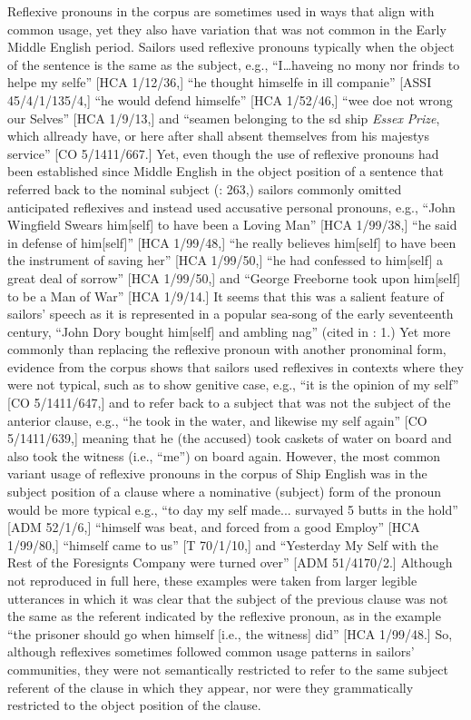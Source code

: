   Reflexive pronouns in the corpus are sometimes used in ways that align with common usage, yet they also have variation that was not common in the Early Middle English period. Sailors used reflexive pronouns typically when the object of the sentence is the same as the subject, e.g., “I…haveing no mony nor frinds to helpe my selfe” [HCA 1/12/36,] “he thought himselfe in ill companie” [ASSI 45/4/1/135/4,] “he would defend himselfe” [HCA 1/52/46,] “wee doe not wrong our Selves” [HCA 1/9/13,] and “seamen belonging to the sd ship \textit{Essex} \textit{Prize}, which allready have, or here after shall absent themselves from his majestys service” [CO 5/1411/667.] Yet, even though the use of reflexive pronouns had been established since Middle English in the object position of a sentence that referred back to the nominal subject (\citealt{MillwardHayes2012}: 263,) sailors commonly omitted anticipated reflexives and instead used accusative personal pronouns, e.g., “John Wingfield Swears him[self] to have been a Loving Man” [HCA 1/99/38,] “he said in defense of him[self]” [HCA 1/99/48,] “he really believes him[self] to have been the instrument of saving her” [HCA 1/99/50,] “he had confessed to him[self] a great deal of sorrow” [HCA 1/99/50,] and “George Freeborne took upon him[self] to be a Man of War” [HCA 1/9/14.] It seems that this was a salient feature of sailors’ speech as it is represented in a popular sea-song of the early seventeenth century, “John Dory bought him[self] and ambling nag” (cited in \citealt{Palmer1986}: 1.) Yet more commonly than replacing the reflexive pronoun with another pronominal form, evidence from the corpus shows that sailors used reflexives in contexts where they were not typical, such as to show genitive case, e.g., “it is the opinion of my self” [CO 5/1411/647,] and to refer back to a subject that was not the subject of the anterior clause, e.g., “he took in the water, and likewise my self again” [CO 5/1411/639,] meaning that he (the accused) took caskets of water on board and also took the witness (i.e., “me”) on board again. However, the most common variant usage of reflexive pronouns in the corpus of Ship English was in the subject position of a clause where a nominative (subject) form of the pronoun would be more typical e.g., “to day my self made... survayed 5 butts in the hold” [ADM 52/1/6,] “himself was beat, and forced from a good Employ” [HCA 1/99/80,] “himself came to us” [T 70/1/10,] and “Yesterday My Self with the Rest of the Foresignts Company were turned over” [ADM 51/4170/2.] Although not reproduced in full here, these examples were taken from larger legible utterances in which it was clear that the subject of the previous clause was not the same as the referent indicated by the reflexive pronoun, as in the example “the prisoner should go when himself [i.e., the witness] did” [HCA 1/99/48.] So, although reflexives sometimes followed common usage patterns in sailors’ communities, they were not semantically restricted to refer to the same subject referent of the clause in which they appear, nor were they grammatically restricted to the object position of the clause. 

